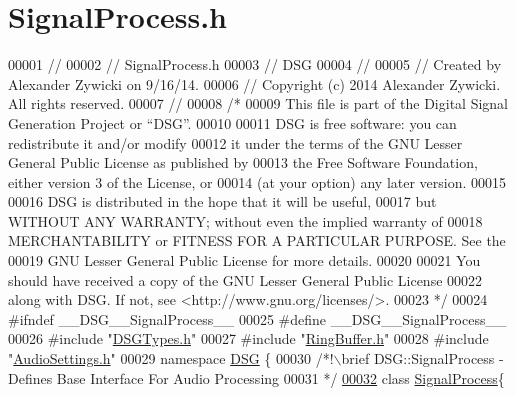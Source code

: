 \hypertarget{_signal_process_8h_source}{\section{Signal\+Process.\+h}
\label{_signal_process_8h_source}
}

\begin{DoxyCode}
00001 \textcolor{comment}{//}
00002 \textcolor{comment}{//  SignalProcess.h}
00003 \textcolor{comment}{//  DSG}
00004 \textcolor{comment}{//}
00005 \textcolor{comment}{//  Created by Alexander Zywicki on 9/16/14.}
00006 \textcolor{comment}{//  Copyright (c) 2014 Alexander Zywicki. All rights reserved.}
00007 \textcolor{comment}{//}
00008 \textcolor{comment}{/*}
00009 \textcolor{comment}{ This file is part of the Digital Signal Generation Project or “DSG”.}
00010 \textcolor{comment}{}
00011 \textcolor{comment}{ DSG is free software: you can redistribute it and/or modify}
00012 \textcolor{comment}{ it under the terms of the GNU Lesser General Public License as published by}
00013 \textcolor{comment}{ the Free Software Foundation, either version 3 of the License, or}
00014 \textcolor{comment}{ (at your option) any later version.}
00015 \textcolor{comment}{}
00016 \textcolor{comment}{ DSG is distributed in the hope that it will be useful,}
00017 \textcolor{comment}{ but WITHOUT ANY WARRANTY; without even the implied warranty of}
00018 \textcolor{comment}{ MERCHANTABILITY or FITNESS FOR A PARTICULAR PURPOSE.  See the}
00019 \textcolor{comment}{ GNU Lesser General Public License for more details.}
00020 \textcolor{comment}{}
00021 \textcolor{comment}{ You should have received a copy of the GNU Lesser General Public License}
00022 \textcolor{comment}{ along with DSG.  If not, see <http://www.gnu.org/licenses/>.}
00023 \textcolor{comment}{ */}
00024 \textcolor{preprocessor}{#ifndef \_\_DSG\_\_SignalProcess\_\_}
00025 \textcolor{preprocessor}{#define \_\_DSG\_\_SignalProcess\_\_}
00026 \textcolor{preprocessor}{#include "\hyperlink{_d_s_g_types_8h}{DSGTypes.h}"}
00027 \textcolor{preprocessor}{#include "\hyperlink{_ring_buffer_8h}{RingBuffer.h}"}
00028 \textcolor{preprocessor}{#include "\hyperlink{_audio_settings_8h}{AudioSettings.h}"}
00029 \textcolor{keyword}{namespace }\hyperlink{namespace_d_s_g}{DSG} \{\textcolor{comment}{}
00030 \textcolor{comment}{    /*!\(\backslash\)brief DSG::SignalProcess - Defines Base Interface For Audio Processing}
00031 \textcolor{comment}{     */}
\hypertarget{_signal_process_8h_source_l00032}{}\hyperlink{class_d_s_g_1_1_signal_process}{00032}     \textcolor{keyword}{class }\hyperlink{class_d_s_g_1_1_signal_process}{SignalProcess}\{

\end{DoxyCode}
